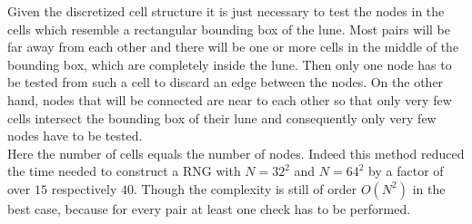         Given the discretized cell structure it is just necessary to test the nodes in the cells which
        resemble a rectangular bounding box of the lune. Most pairs will be
        far away from each other and there will be one or more cells in the
        middle of the bounding box, which are completely inside the lune.
        Then only one node has to be tested from such a cell to discard an
        edge between the nodes. On the other hand, nodes that will be connected
        are near to each other so that only very few cells intersect the bounding
        box of their lune and consequently only very few nodes have to be tested.\\
        Here the number of cells equals the number of nodes.
        Indeed this method reduced the time needed to construct a RNG with
        \(N=32^2\) and \(N=64^2\) by a factor of
        over \(15\) respectively \(40\). Though the complexity is still of
        order \(O(N^2)\) in the best case, because for every pair at least
        one check has to be performed.
